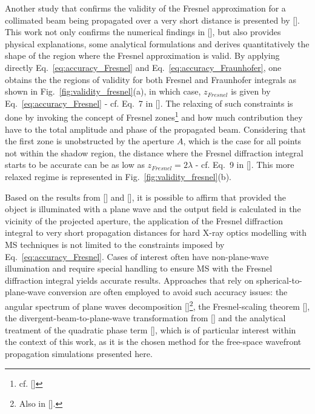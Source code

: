 \begin{refsection}
Another study that confirms the validity of the Fresnel approximation for a collimated beam being propagated over a very short distance is presented by [\cite{Rees87}]. This work not only confirms the numerical findings in [\cite{Southwell1981}], but also provides physical explanations, some analytical formulations and derives quantitatively the shape of the region where the Fresnel approximation is valid. By applying directly Eq.~\ref{eq:accuracy_Fresnel} and  Eq.~\ref{eq:accuracy_Fraunhofer}, one obtains the the regions of validity for both Fresnel and Fraunhofer integrals as shown in Fig.~\ref{fig:validity_fresnel}(a), in which case, $z_{Fresnel}$ is given by Eq.~\ref{eq:accuracy_Fresnel} - cf. Eq.~7 in [\cite{Rees87}]. The relaxing of such constraints is done by invoking the concept of Fresnel zones\footnote{cf. [\cite[\textit{§10.3.1}]{Hetch2017}]} and how much contribution they have to the total amplitude and phase of the propagated beam. Considering that the first zone is unobstructed by the aperture $A$, which is the case for all points not within the shadow region, the distance where the Fresnel diffraction integral starts to be accurate can be as low as $z_{Fresnel}=2\lambda$ - cf. Eq.~9 in [\cite{Rees87}]. This more relaxed regime is represented in Fig.~\ref{fig:validity_fresnel}(b).

Based on the results from [\cite{Southwell1981}] and [\cite{Rees87}], it is possible to affirm that provided the object is illuminated with a plane wave and the output field is calculated in the vicinity of the projected aperture, the application of the Fresnel diffraction integral to very short propagation distances for hard X-ray optics modelling with MS techniques is not limited to the constraints imposed by Eq.~\ref{eq:accuracy_Fresnel}. Cases of interest often have non-plane-wave illumination and require special handling to ensure MS with the Fresnel diffraction integral yields accurate results. Approaches that rely on spherical-to-plane-wave conversion are often employed to avoid such accuracy issues: the angular spectrum of plane waves decomposition [\cite[\textit{\S1.3}]{Paganin2006}]\footnote{Also in [\cite[\textit{\S3.10}~\&~\textit{\S4.2.4}]{Goodman2017}].}, the Fresnel-scaling theorem [\cite[\textit{\S A}]{Paganin2006}], the divergent-beam-to-plane-wave transformation from [\cite{Munro2019}] and the analytical treatment of the quadratic phase term [\cite{Chubar2019}], which is of particular interest within the context of this work, as it is the chosen method for the free-space wavefront propagation simulations presented here. 


\end{refsection}
